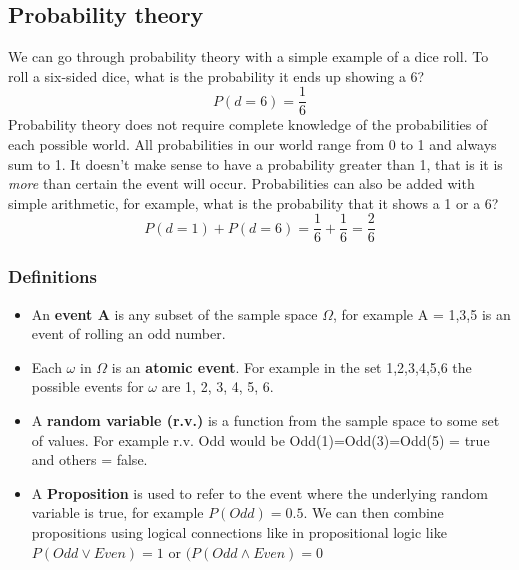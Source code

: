 \documentclass{article}
\begin{document}
\subsection{Probability theory}
We can go through probability theory with a simple example of a dice roll. To roll a six-sided dice, what is the probability it ends up showing a 6?
\begin{equation}
P(d = 6) = \frac{1}{6}
\end{equation}
Probability theory does not require complete knowledge of the probabilities of each possible world. All probabilities in our world range from 0 to 1 and always sum to 1. It doesn't make sense to have a probability greater than 1, that is it is \textit{more} than certain the event will occur. Probabilities can also be added with simple arithmetic, for example, what is the probability that it shows a 1 or a 6?
\begin{equation}
P(d = 1) + P(d = 6) = \frac{1}{6} + \frac{1}{6} = \frac{2}{6}
\end{equation}
\subsubsection{Definitions}
\begin{itemize}
\item An \textbf{event A} is any subset of the sample space $\Omega$, for example A = {1,3,5} is an event of rolling an odd number.
\item Each $\omega$ in $\Omega$ is an \textbf{atomic event}. For example in the set {1,2,3,4,5,6} the possible events for $\omega$ are 1, 2, 3, 4, 5, 6.
\item A \textbf{random variable (r.v.)} is a function from the sample space to some set of values. For example r.v. Odd would be Odd(1)=Odd(3)=Odd(5) = true and others = false.
\item A \textbf{Proposition} is used to refer to the event where the underlying random variable is true, for example $P(Odd) = 0.5$. We can then combine propositions using logical connections like in propositional logic like $P(Odd \vee Even) = 1$ or $(P(Odd \wedge Even) = 0$
\end{itemize}
\end{document}
